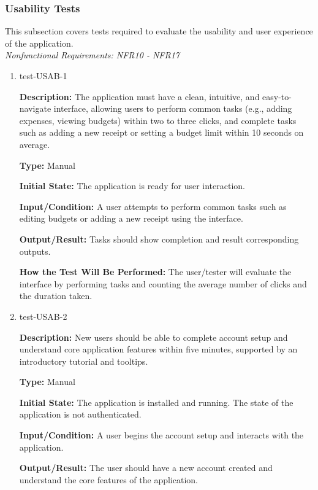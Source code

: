 \documentclass[12pt, titlepage]{article}
\begin{document}
\subsubsection{Usability Tests}

This subsection covers tests required to evaluate the usability and user experience of the application. \\
\textit{Nonfunctional Requirements: NFR10 - NFR17}

\begin{enumerate}

\item{test-USAB-1\\}

\textbf{Description:} The application must have a clean, intuitive, and
easy-to-navigate interface, allowing users to perform common tasks (e.g., adding
expenses, viewing budgets) within two to three clicks, and complete tasks such
as adding a new receipt or setting a budget limit within 10 seconds on average.

\textbf{Type:} Manual
					
\textbf{Initial State:} The application is ready for user interaction.
					
\textbf{Input/Condition:} A user attempts to perform common tasks such as
editing budgets or adding a new receipt using the interface.
					
\textbf{Output/Result:} Tasks should show completion and result corresponding
outputs.
					
\textbf{How the Test Will Be Performed:} The user/tester will evaluate the
interface by performing tasks and counting the average number of clicks and the
duration taken.

\item{test-USAB-2\\}

\textbf{Description:} New users should be able to complete account setup and
understand core application features within five minutes, supported by an
introductory tutorial and tooltips.

\textbf{Type:} Manual
					
\textbf{Initial State:} The application is installed and running. The state of
the application is not authenticated.
					
\textbf{Input/Condition:} A user begins the account setup and interacts with
the application.
					
\textbf{Output/Result:} The user should have a new account created and
understand the core features of the application.
					

\end{enumerate}
\end{document}
